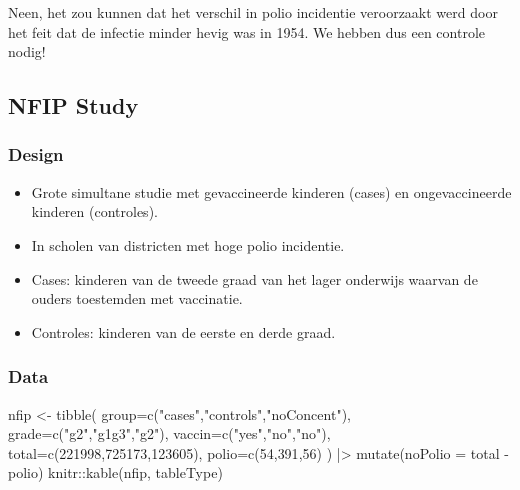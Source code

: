 \documentclass[
  dutch,
  letterpaper,
  12pt]{book}
\newenvironment{Shaded}{\begin{snugshade}}{\end{snugshade}}
\newcommand{\AttributeTok}[1]{\textcolor[rgb]{0.40,0.45,0.13}{#1}}
\newcommand{\DecValTok}[1]{\textcolor[rgb]{0.68,0.00,0.00}{#1}}
\newcommand{\FunctionTok}[1]{\textcolor[rgb]{0.28,0.35,0.67}{#1}}
\newcommand{\NormalTok}[1]{\textcolor[rgb]{0.00,0.23,0.31}{#1}}
\newcommand{\OtherTok}[1]{\textcolor[rgb]{0.00,0.23,0.31}{#1}}
\newcommand{\SpecialCharTok}[1]{\textcolor[rgb]{0.37,0.37,0.37}{#1}}
\newcommand{\StringTok}[1]{\textcolor[rgb]{0.13,0.47,0.30}{#1}}
\providecommand{\tightlist}{%
  \setlength{\itemsep}{0pt}\setlength{\parskip}{0pt}}
\theoremstyle{definition}
\theoremstyle{definition}
\theoremstyle{definition}
\theoremstyle{remark}
\begin{document}
Neen, het zou kunnen dat het verschil in polio incidentie veroorzaakt
werd door het feit dat de infectie minder hevig was in 1954. We hebben
dus een controle nodig!

\subsection{NFIP Study}\label{nfip-study}

\subsubsection{Design}\label{design}

\begin{itemize}
\tightlist
\item
  Grote simultane studie met gevaccineerde kinderen (cases) en
  ongevaccineerde kinderen (controles).
\item
  In scholen van districten met hoge polio incidentie.
\item
  Cases: kinderen van de tweede graad van het lager onderwijs waarvan de
  ouders toestemden met vaccinatie.
\item
  Controles: kinderen van de eerste en derde graad.
\end{itemize}

\subsubsection{Data}\label{data}

\begin{Shaded}
\begin{Highlighting}[]
\NormalTok{nfip }\OtherTok{\textless{}{-}} \FunctionTok{tibble}\NormalTok{(}
  \AttributeTok{group=}\FunctionTok{c}\NormalTok{(}\StringTok{"cases"}\NormalTok{,}\StringTok{"controls"}\NormalTok{,}\StringTok{"noConcent"}\NormalTok{),}
  \AttributeTok{grade=}\FunctionTok{c}\NormalTok{(}\StringTok{"g2"}\NormalTok{,}\StringTok{"g1g3"}\NormalTok{,}\StringTok{"g2"}\NormalTok{),}
  \AttributeTok{vaccin=}\FunctionTok{c}\NormalTok{(}\StringTok{"yes"}\NormalTok{,}\StringTok{"no"}\NormalTok{,}\StringTok{"no"}\NormalTok{),}
  \AttributeTok{total=}\FunctionTok{c}\NormalTok{(}\DecValTok{221998}\NormalTok{,}\DecValTok{725173}\NormalTok{,}\DecValTok{123605}\NormalTok{),}
  \AttributeTok{polio=}\FunctionTok{c}\NormalTok{(}\DecValTok{54}\NormalTok{,}\DecValTok{391}\NormalTok{,}\DecValTok{56}\NormalTok{)}
\NormalTok{  ) }\SpecialCharTok{|\textgreater{}}
  \FunctionTok{mutate}\NormalTok{(}\AttributeTok{noPolio =}\NormalTok{ total }\SpecialCharTok{{-}}\NormalTok{ polio)}
\NormalTok{knitr}\SpecialCharTok{::}\FunctionTok{kable}\NormalTok{(nfip, tableType)}
\end{Highlighting}
\end{Shaded}
\end{document}
